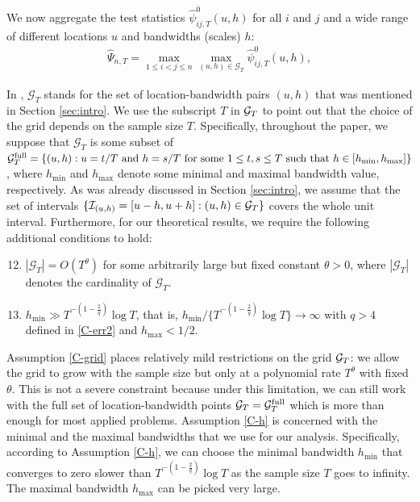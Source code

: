 \documentclass[a4paper,12pt]{article}
\makeatletter
\renewcommand{\eqref}[1]{\tagform@{\ref{#1}}}
\makeatother
\begin{document}
We now aggregate the test statistics $\hat{\psi}^0_{ij, T}(u,h)$ for all $i$ and $j$ and a wide range of different locations $u$ and bandwidths (scales) $h$:
\begin{align}\label{eq:Psi_hat}
	\widehat{\Psi}_{n,T} = \max_{1 \le i < j \le n}\max_{(u,h) \in \mathcal{G}_T} \hat{\psi}^0_{ij,T}(u, h),
\end{align}

In \eqref{eq:Psi_hat}, $\mathcal{G}_T$ stands for the set of location-bandwidth pairs $(u, h)$ that was mentioned in Section \ref{sec:intro}. We use the subscript $T$ in $\mathcal{G}_T$ to point out that the choice of the grid depends on the sample size $T$. Specifically, throughout the paper, we suppose that $\mathcal{G}_T$ is some subset of $\mathcal{G}_T^{\text{full}} = \{ (u,h): u = t/T \text{ and } h = s/T \text{ for some } 1 \le t, s \le T \text{ such that } \linebreak h \in [h_{\min},h_{\max}] \}$, where $h_{\min}$ and $h_{\max}$ denote some minimal and maximal bandwidth value, respectively. As was already discussed in Section \ref{sec:intro}, we assume that the set of intervals $\{\mathcal{I}_{(u, h)} = [u-h, u+h]: (u, h) \in \mathcal{G}_T\}$ covers the whole unit interval. Furthermore, for our theoretical results, we require the following additional conditions to hold:
\begin{enumerate}[label=(C\arabic*),leftmargin=1.05cm]
\setcounter{enumi}{11}

\item \label{C-grid} $|\mathcal{G}_T| = O(T^\theta)$ for some arbitrarily large but fixed constant $\theta > 0$, where $|\mathcal{G}_T|$ denotes the cardinality of $\mathcal{G}_T$. 

\item \label{C-h} $h_{\min} \gg T^{-(1-\frac{2}{q})} \log T$, that is, $h_{\min} / \{ T^{-(1-\frac{2}{q})} \log T \} \rightarrow \infty$ with $q > 4$ defined in \ref{C-err2} and $h_{\max} < 1/2$.

\end{enumerate}
Assumption \ref{C-grid} places relatively mild restrictions on the grid $\mathcal{G}_T$: we allow the grid to grow with the sample size but only at a polynomial rate $T^\theta$ with fixed $\theta$. This is not a severe constraint because under this limitation, we can still work with the full set of location-bandwidth points $\mathcal{G}_T = \mathcal{G}_T^{\text{full}}$ which is more than enough for most applied problems. Assumption \ref{C-h} is concerned with the minimal and the maximal bandwidths that we use for our analysis. Specifically, according to Assumption \ref{C-h}, we can choose the minimal bandwidth $h_{\min}$ that converges to zero slower than $T^{-(1-\frac{2}{q})} \log T$ as the sample size $T$ goes to infinity. The maximal bandwidth $h_{\max}$ can be picked very large.
\end{document}

